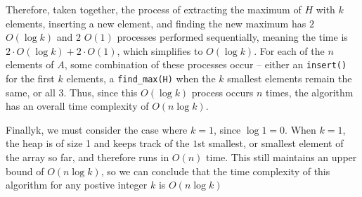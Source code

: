 \documentclass[11pt]{article}
\begin{document}
\begin{enumerate}
Therefore, taken together, the process of extracting the maximum of $H$ with $k$ elements, inserting a new element, and finding the new maximum 
has $2$ $O(\log k)$ and $2$ $O(1)$ processes performed sequentially, meaning the time is $2 \cdot O(\log k) + 2 \cdot O(1)$, 
which simplifies to $O(\log k)$. For each of the $n$ elements of $A$, some combination of these processes occur -- 
either an \verb|insert()| for the first $k$ elements, a \verb|find_max(H)| when the $k$ smallest elements remain the same, or all $3$. 
Thus, since this $O(\log k)$ process occurs $n$ times, the algorithm has an overall time complexity of $O(n \log k)$.

Finallyk, we must consider the case where $k = 1$, since $\log 1 = 0$. When $k = 1$, the heap is of size 1 and keeps track of the $1$st smallest, 
or smallest element of the array so far, and therefore runs in $O(n)$ time. This still maintains an upper bound of $O(n \log k)$, 
so we can conclude that the time complexity of this algorithm for any postive integer $k$ is $O(n \log k)$

\end{enumerate}
\end{document}
